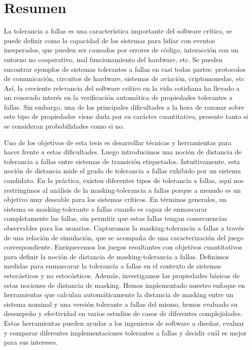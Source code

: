 \chapter*{Resumen}

La tolerancia a fallas es una característica importante del software crítico, se puede definir como la capacidad de los sistemas para lidiar con eventos inesperados, que pueden ser causados por errores de código, interacción con un entorno no cooperativo,
mal funcionamiento del hardware, etc.
Se pueden encontrar ejemplos de sistemas tolerantes a fallas en casi todas partes:
protocolos de comunicación, circuitos de hardware, sistemas de aviación,
criptomonedas, etc
Así, la creciente relevancia del software crítico en
la vida cotidiana ha llevado a un renovado interés en la verificación automática de propiedades tolerantes a fallas. Sin embargo, una de las principales dificultades a la hora de razonar sobre este tipo de propiedades viene dada por su carácter cuantitativo, presente tanto si se consideran probabilidades como si no.

Uno de los objetivos de esta tesis es desarrollar técnicas y herramientas para hacer frente a estas dificultades.
Luego introducimos una noción de distancia de tolerancia a fallas entre sistemas de transición etiquetados. Intuitivamente, esta noción de distancia mide el grado de tolerancia a fallas exhibido por un sistema candidato.
En la práctica, existen diferentes tipos de tolerancia a fallas, aquí nos restringimos al análisis de la masking-tolerancia a fallas porque a menudo es un objetivo muy deseable para los sistemas críticos.
En términos generales, un sistema es masking-tolerante a fallas cuando es capaz de enmascarar completamente las fallas, sin permitir que estas fallas tengan consecuencias observables para los usuarios.
Capturamos la masking-tolerancia a fallas a través de una relación de simulación, que se acompaña de una caracterización del juego correspondiente.
Enriquecemos los juegos resultantes con objetivos cuantitativos para
definir la noción de distancia de masking-tolerancia a fallas.
Definimos medidas para enmascarar la tolerancia a fallas en el contexto de sistemas estocásticos y no estocásticos. Además, investigamos las propiedades básicas de estas nociones de distancia de masking.
Hemos implementado nuestro enfoque en herramientas que calculan automáticamente la distancia de masking entre un sistema nominal y una versión tolerante a fallas del mismo, hemos evaluado su desempeño y efectividad en varios estudios de casos de diferentes complejidades.
Estas herramientas pueden ayudar a los ingenieros de software a diseñar, evaluar y comparar diferentes implementaciones tolerantes a fallas y decidir cuál es mejor para sus intereses.

